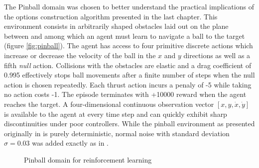 The Pinball domain \cite{Konidaris2009} was chosen to better understand the practical implications of the options construction algorithm presented in the last chapter. This environment consists in arbitrarily shaped obstacles laid out on the plane between and among which an agent must learn to navigate a ball to the target (figure \ref{fig:pinball}). The agent has access to four primitive discrete actions which increase or decrease the velocity of the ball in the $x$ and $y$ directions as well as a fifth \textit{null} action. Collisions with the obstacles are elastic and a drag coefficient of 0.995 effectively stops ball movements after a finite number of steps when the null action is chosen repeatedly. Each thrust action incurs a penaly of -5 while taking no action costs -1. The episode terminates with +10000 reward when the agent reaches  the target. A four-dimensional continuous observation vector $[ x, y, \dot{x}, \dot{y}]$ is available to the agent at every time step and can quickly exhibit sharp discontinuities under poor controllers. While the pinball environment as presented originally in \cite{Konidaris2009} is purely deterministic, normal noise with standard deviation $\sigma = 0.03$ was added exactly as in \cite{Tamar2013}. 

\begin{figure}
\centering
{}%
%
\caption{Pinball domain for reinforcement learning}
\end{figure}

